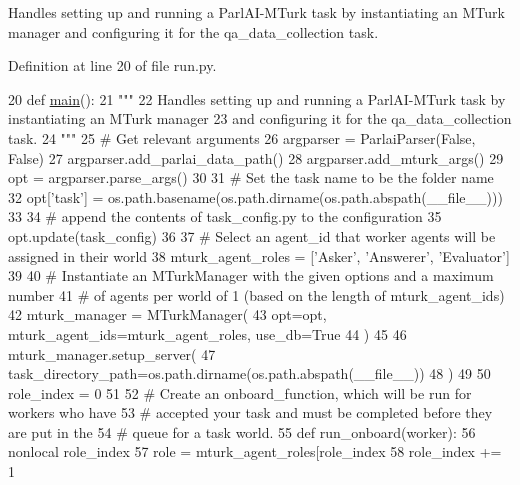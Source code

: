 \begin{DoxyVerb}Handles setting up and running a ParlAI-MTurk task by instantiating an MTurk manager
and configuring it for the qa_data_collection task.
\end{DoxyVerb}
 

Definition at line 20 of file run.\+py.


\begin{DoxyCode}
20 \textcolor{keyword}{def }\hyperlink{namespaceprojects_1_1wizard__of__wikipedia_1_1mturk__evaluation__task_1_1run_ad3ab2c71f8083c3112815c0b363d316b}{main}():
21     \textcolor{stringliteral}{"""}
22 \textcolor{stringliteral}{    Handles setting up and running a ParlAI-MTurk task by instantiating an MTurk manager}
23 \textcolor{stringliteral}{    and configuring it for the qa\_data\_collection task.}
24 \textcolor{stringliteral}{    """}
25     \textcolor{comment}{# Get relevant arguments}
26     argparser = ParlaiParser(\textcolor{keyword}{False}, \textcolor{keyword}{False})
27     argparser.add\_parlai\_data\_path()
28     argparser.add\_mturk\_args()
29     opt = argparser.parse\_args()
30 
31     \textcolor{comment}{# Set the task name to be the folder name}
32     opt[\textcolor{stringliteral}{'task'}] = os.path.basename(os.path.dirname(os.path.abspath(\_\_file\_\_)))
33 
34     \textcolor{comment}{# append the contents of task\_config.py to the configuration}
35     opt.update(task\_config)
36 
37     \textcolor{comment}{# Select an agent\_id that worker agents will be assigned in their world}
38     mturk\_agent\_roles = [\textcolor{stringliteral}{'Asker'}, \textcolor{stringliteral}{'Answerer'}, \textcolor{stringliteral}{'Evaluator'}]
39 
40     \textcolor{comment}{# Instantiate an MTurkManager with the given options and a maximum number}
41     \textcolor{comment}{# of agents per world of 1 (based on the length of mturk\_agent\_ids)}
42     mturk\_manager = MTurkManager(
43         opt=opt, mturk\_agent\_ids=mturk\_agent\_roles, use\_db=\textcolor{keyword}{True}
44     )
45 
46     mturk\_manager.setup\_server(
47         task\_directory\_path=os.path.dirname(os.path.abspath(\_\_file\_\_))
48     )
49 
50     role\_index = 0
51 
52     \textcolor{comment}{# Create an onboard\_function, which will be run for workers who have}
53     \textcolor{comment}{# accepted your task and must be completed before they are put in the}
54     \textcolor{comment}{# queue for a task world.}
55     \textcolor{keyword}{def }run\_onboard(worker):
56         nonlocal role\_index
57         role = mturk\_agent\_roles[role\_index %
58         role\_index += 1

\end{DoxyCode}
